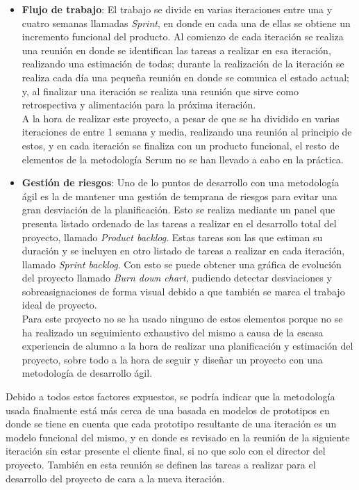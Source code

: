 \begin{itemize}
	\item \textbf{Flujo de trabajo}: El trabajo se divide en varias iteraciones entre una y cuatro semanas llamadas \textit{Sprint}, en donde en cada una de ellas se obtiene un incremento funcional del producto. Al comienzo de cada iteración se realiza una reunión en donde se identifican las tareas a realizar en esa iteración, realizando una estimación de todas; durante la realización de la iteración se realiza cada día una pequeña reunión en donde se comunica el estado actual; y, al finalizar una iteración se realiza una reunión que sirve como retrospectiva y alimentación para la próxima iteración. \\
	
	A la hora de realizar este proyecto, a pesar de que se ha dividido en varias iteraciones de entre 1 semana y media, realizando una reunión al principio de estos, y en cada iteración se finaliza con un producto funcional, el resto de elementos de la metodología Scrum no se han llevado a cabo en la práctica.
	\item \textbf{Gestión de riesgos}: Uno de lo puntos de desarrollo con una metodología ágil es la de mantener una gestión de temprana de riesgos para evitar una gran desviación de la planificación. Esto se realiza mediante un panel que presenta listado ordenado de las tareas a realizar en el desarrollo total del proyecto, llamado \textit{Product backlog}. Estas tareas son las que estiman su duración y se incluyen en otro listado de tareas a realizar en cada iteración, llamado \textit{Sprint backlog}. Con esto se puede obtener una gráfica de evolución del proyecto llamado \textit{Burn down chart}, pudiendo detectar desviaciones y sobreasignaciones de forma visual debido a que también se marca el trabajo ideal de proyecto. \\
	
	Para este proyecto no se ha usado ninguno de estos elementos porque no se ha realizado un seguimiento exhaustivo del mismo a causa de la escasa experiencia de alumno a la hora de realizar una planificación y estimación del proyecto, sobre todo a la hora de seguir y diseñar un proyecto con una metodología de desarrollo ágil.
\end{itemize}

Debido a todos estos factores expuestos, se podría indicar que la metodología usada finalmente está más cerca de una basada en modelos de prototipos en donde se tiene en cuenta que cada prototipo resultante de una iteración es un modelo funcional del mismo, y en donde es revisado en la reunión de la siguiente iteración sin estar presente el cliente final, si no que solo con el director del proyecto. También en esta reunión se definen las tareas a realizar para el desarrollo del proyecto de cara a la nueva iteración. \\

